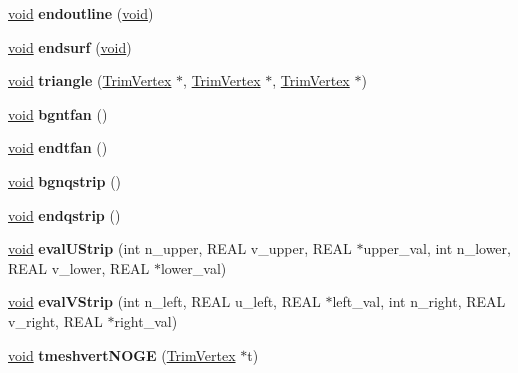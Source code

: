 \begin{DoxyCompactItemize}
\hyperlink{interfacevoid}{void} {\bfseries endoutline} (\hyperlink{interfacevoid}{void})
\item 
\mbox{\label{class_backend_a602cdce08cd76dd9e853c9a853cc9d32}} 
\hyperlink{interfacevoid}{void} {\bfseries endsurf} (\hyperlink{interfacevoid}{void})
\item 
\mbox{\label{class_backend_aeaea49e894d7ba6dd54e774f17af6216}} 
\hyperlink{interfacevoid}{void} {\bfseries triangle} (\hyperlink{class_trim_vertex}{Trim\+Vertex} $\ast$, \hyperlink{class_trim_vertex}{Trim\+Vertex} $\ast$, \hyperlink{class_trim_vertex}{Trim\+Vertex} $\ast$)
\item 
\mbox{\label{class_backend_a53a98103f54a5a039c2891f93a2dc191}} 
\hyperlink{interfacevoid}{void} {\bfseries bgntfan} ()
\item 
\mbox{\label{class_backend_a783873beddbb9335e47706cde7269d22}} 
\hyperlink{interfacevoid}{void} {\bfseries endtfan} ()
\item 
\mbox{\label{class_backend_a458d95f27ecc8b18c61d6fa8b2393f0c}} 
\hyperlink{interfacevoid}{void} {\bfseries bgnqstrip} ()
\item 
\mbox{\label{class_backend_a95f3aee9fc68aca9e4a0d2b4c27d5b7f}} 
\hyperlink{interfacevoid}{void} {\bfseries endqstrip} ()
\item 
\mbox{\label{class_backend_a24da175137da71b3dbe77b3d38aeaba6}} 
\hyperlink{interfacevoid}{void} {\bfseries eval\+U\+Strip} (int n\+\_\+upper, R\+E\+AL v\+\_\+upper, R\+E\+AL $\ast$upper\+\_\+val, int n\+\_\+lower, R\+E\+AL v\+\_\+lower, R\+E\+AL $\ast$lower\+\_\+val)
\item 
\mbox{\label{class_backend_a83589a0afa6ed63b0206b8bbdea5dee3}} 
\hyperlink{interfacevoid}{void} {\bfseries eval\+V\+Strip} (int n\+\_\+left, R\+E\+AL u\+\_\+left, R\+E\+AL $\ast$left\+\_\+val, int n\+\_\+right, R\+E\+AL v\+\_\+right, R\+E\+AL $\ast$right\+\_\+val)
\item 
\mbox{\label{class_backend_ab01be1822a19abda7266f462a01154ca}} 
\hyperlink{interfacevoid}{void} {\bfseries tmeshvert\+N\+O\+GE} (\hyperlink{class_trim_vertex}{Trim\+Vertex} $\ast$t)

\end{DoxyCompactItemize}
